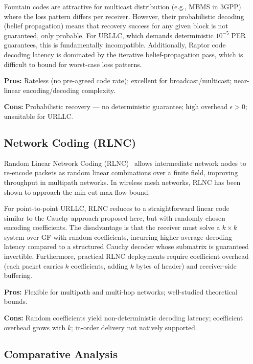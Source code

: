 \documentclass[conference]{IEEEtran}
\begin{document}
Fountain codes are attractive for multicast distribution (e.g., MBMS in
3GPP) where the loss pattern differs per receiver. However, their
probabilistic decoding (belief propagation) means that recovery success
for any given block is not guaranteed, only probable. For URLLC, which
demands deterministic $10^{-5}$ PER guarantees, this is fundamentally
incompatible. Additionally, Raptor code decoding latency is dominated by
the iterative belief-propagation pass, which is difficult to bound for
worst-case loss patterns.

\noindent\textbf{Pros:} Rateless (no pre-agreed code rate); excellent
for broadcast/multicast; near-linear encoding/decoding complexity.\par
\textbf{Cons:} Probabilistic recovery --- no deterministic guarantee;
high overhead $\epsilon > 0$; unsuitable for URLLC.

\subsection{Network Coding (RLNC)}

Random Linear Network Coding (RLNC)~\cite{ahlswede2000} allows
intermediate network nodes to re-encode packets as random linear
combinations over a finite field, improving throughput in multipath
networks. In wireless mesh networks, RLNC has been shown to approach
the min-cut max-flow bound.

For point-to-point URLLC, RLNC reduces to a straightforward linear code
similar to the Cauchy approach proposed here, but with randomly chosen
encoding coefficients. The disadvantage is that the receiver must solve a
$k \times k$ system over GF with random coefficients, incurring higher
average decoding latency compared to a structured Cauchy decoder whose
submatrix is guaranteed invertible. Furthermore, practical RLNC
deployments require coefficient overhead (each packet carries $k$
coefficients, adding $k$ bytes of header) and receiver-side buffering.

\noindent\textbf{Pros:} Flexible for multipath and multi-hop networks;
well-studied theoretical bounds.\par
\textbf{Cons:} Random coefficients yield non-deterministic decoding
latency; coefficient overhead grows with $k$; in-order delivery not
natively supported.

\subsection{Comparative Analysis}
\end{document}
